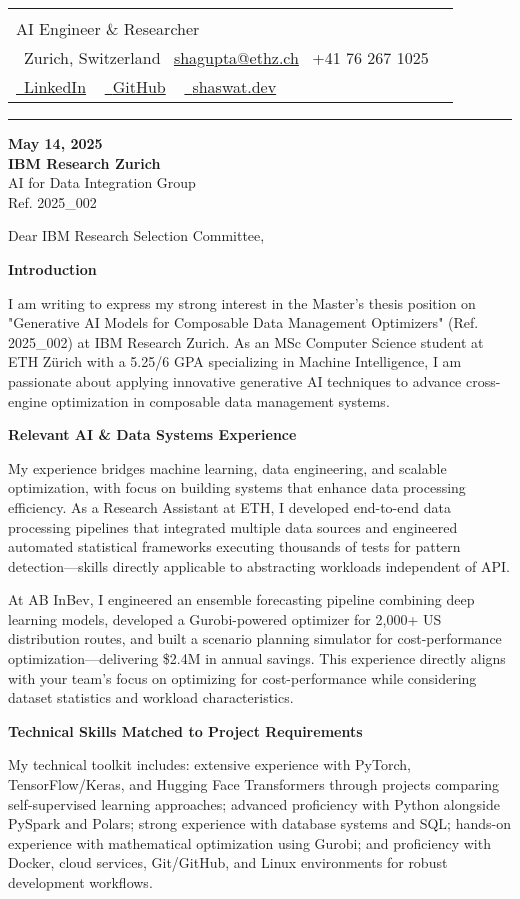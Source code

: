\documentclass[letterpaper,10pt]{article}
\makeatletter
\newcommand{\icontext}[2]{\raisebox{-0.2\height}{#1}~#2}
\newcommand{\profileheader}{%
  \begin{profilebox}
    \begin{tabularx}{\textwidth}{@{}l@{\hspace{1.1cm}}X@{}}
      \fcolorbox{accentblue}{white}{
        \texttt{[image: shaswat.png]}
      }
      &
      \begin{minipage}[b]{\linewidth}
        {\Huge \textcolor{darkroyalblue}{\scshape Shaswat Gupta}} \\[3pt]
        {\large \textcolor{mutedtext}{AI Engineer \& Researcher}} \\[6pt]
        \icontext{\faMapMarker}{\textcolor{mutedtext}{Zurich, Switzerland}} \quad
        \icontext{\faEnvelope}{\href{mailto:shagupta@ethz.ch}{\textcolor{accentblue}{shagupta@ethz.ch}}} \quad
        \icontext{\faPhone}{\textcolor{accentblue}{+41 76 267 1025}} \\[5pt]
        \href{https://linkedin.com/in/shaswat-gupta/}{\icontext{\faLinkedin}{\textcolor{accentblue}{LinkedIn}}} ~
        \href{https://github.com/Shaswat-G}{\icontext{\faGithub}{\textcolor{accentblue}{GitHub}}} ~
        \href{https://shaswat.dev}{\icontext{\faGlobe}{\textcolor{accentblue}{shaswat.dev}}}
      \end{minipage}
    \end{tabularx}
    \vspace{6pt}
    \hrule height 1.2pt \color{bordercolor}
  \end{profilebox}
}
\newcommand{\letterSection}[1]{%
  \begin{sectionbox}
    \color{darkroyalblue}\scshape\raggedright\large\bfseries #1
  \end{sectionbox}
}
\makeatother
\begin{document}
\profileheader

{\color{mutedtext}
\begin{justify}
\textbf{May 14, 2025} \\[1pt]
\textbf{IBM Research Zurich} \\
AI for Data Integration Group \\
Ref. 2025\_002 \\
\end{justify}
}
\vspace{-10pt}
{\color{headercolor}
\begin{justify}
Dear IBM Research Selection Committee,
\end{justify}
}

\letterSection{Introduction}
\begin{justify}
I am writing to express my strong interest in the Master's thesis position on "Generative AI Models for Composable Data Management Optimizers" (Ref. 2025\_002) at IBM Research Zurich. As an MSc Computer Science student at ETH Zürich with a 5.25/6 GPA specializing in Machine Intelligence, I am passionate about applying innovative generative AI techniques to advance cross-engine optimization in composable data management systems.
\end{justify}

\letterSection{Relevant AI \& Data Systems Experience}
\begin{justify}
My experience bridges machine learning, data engineering, and scalable optimization, with focus on building systems that enhance data processing efficiency. As a Research Assistant at ETH, I developed end-to-end data processing pipelines that integrated multiple data sources and engineered automated statistical frameworks executing thousands of tests for pattern detection—skills directly applicable to abstracting workloads independent of API.

At AB InBev, I engineered an ensemble forecasting pipeline combining deep learning models, developed a Gurobi-powered optimizer for 2,000+ US distribution routes, and built a scenario planning simulator for cost-performance optimization—delivering \$2.4M in annual savings. This experience directly aligns with your team's focus on optimizing for cost-performance while considering dataset statistics and workload characteristics.
\end{justify}

\letterSection{Technical Skills Matched to Project Requirements}
\begin{justify}
My technical toolkit includes: extensive experience with PyTorch, TensorFlow/Keras, and Hugging Face Transformers through projects comparing self-supervised learning approaches; advanced proficiency with Python alongside PySpark and Polars; strong experience with database systems and SQL; hands-on experience with mathematical optimization using Gurobi; and proficiency with Docker, cloud services, Git/GitHub, and Linux environments for robust development workflows.
\end{justify}
\end{document}
